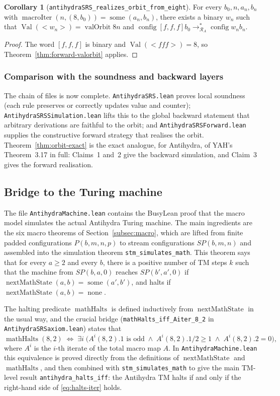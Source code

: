 \documentclass[11pt,a4paper]{article}
\theoremstyle{definition}
\newtheorem{corollary}[definition]{Corollary}
\newcommand{\lt}{<}
\newcommand{\gt}{>}
\newcommand{\val}{\operatorname{Val}}
\newcommand{\config}{\operatorname{config}}
\newcommand{\antihydraSRS}{\mathcal{R}_{A}}
\newcommand{\nextMathState}{\operatorname{nextMathState}}
\newcommand{\mathHalts}{\operatorname{mathHalts}}
\newcommand{\some}{\operatorname{some}}
\newcommand{\none}{\operatorname{none}}
\newcommand{\valOrbit}{\operatorname{valOrbit}}
\newcommand{\macroIter}{\operatorname{macroIter}}
\begin{document}
\begin{corollary}[\texttt{antihydraSRS\_realizes\_orbit\_from\_eight}]
\label{cor:from-eight}
For every $b_0,n,a_n,b_n$ with
$\macroIter(n,(8,b_0))=\some(a_n,b_n)$, there exists a binary $w_n$ such
that
$\val(\lt w_n\gt)=\valOrbit{8}{n}$ and
$\config{[f,f,f]}{b_0}\to^{*}_{\antihydraSRS}\config{w_n}{b_n}$.
\end{corollary}
\begin{proof}
The word $[f,f,f]$ is binary and $\val(\lt fff\gt)=8$, so
Theorem~\ref{thm:forward-valorbit} applies.
\end{proof}

\subsubsection*{Comparison with the soundness and backward layers}
The chain of files is now complete.  \texttt{AntihydraSRS.lean} proves
local soundness (each rule preserves or correctly updates value and
counter); \texttt{AntihydraSRSSimulation.lean} lifts this to the global
backward statement that arbitrary derivations are faithful to the orbit;
and \texttt{AntihydraSRSForward.lean} supplies the constructive forward
strategy that realises the orbit.  Theorem~\ref{thm:orbit-exact} is the
exact analogue, for Antihydra, of YAH's Theorem~3.17 in full: Claims~1
and~2 give the backward simulation, and Claim~3 gives the forward
realisation.

\subsection{Bridge to the Turing machine}
\label{subsec:tm-bridge}

The file \texttt{AntihydraMachine.lean} contains the BusyLean proof
that the macro model simulates the actual Antihydra Turing machine.  The
main ingredients are the six macro theorems of
Section~\ref{subsec:macro}, which are lifted from finite padded
configurations $P(b,m,n,p)$ to stream configurations $SP(b,m,n)$ and
assembled into the simulation theorem
\texttt{stm\_simulates\_math}.  This theorem says that for every
$a\ge2$ and every $b$, there is a positive number of TM steps $k$ such
that the machine from $SP(b,a,0)$ reaches $SP(b',a',0)$ if
$\nextMathState(a,b)=\some(a',b')$, and halts if
$\nextMathState(a,b)=\none$.

The halting predicate $\mathHalts$ is defined inductively from
$\nextMathState$ in the usual way, and the crucial bridge
(\texttt{mathHalts\_iff\_Aiter\_8\_2} in
\texttt{AntihydraSRSaxiom.lean}) states that
\begin{equation}
  \label{eq:halts-iter}
  \mathHalts(8,2)
  \;\iff\;
  \exists i\;\bigl(A^{i}(8,2).1\text{ is odd}\;\wedge\;A^{i}(8,2).1/2\ge1\;\wedge\;A^{i}(8,2).2=0\bigr),
\end{equation}
where $A^{i}$ is the $i$-th iterate of the total macro map $A$.  In
\texttt{AntihydraMachine.lean} this equivalence is proved directly from
the definitions of $\nextMathState$ and $\mathHalts$, and then combined
with \texttt{stm\_simulates\_math} to give the main TM-level result
\texttt{antihydra\_halts\_iff}: the Antihydra TM halts if and only if
the right-hand side of \eqref{eq:halts-iter} holds.
\end{document}
